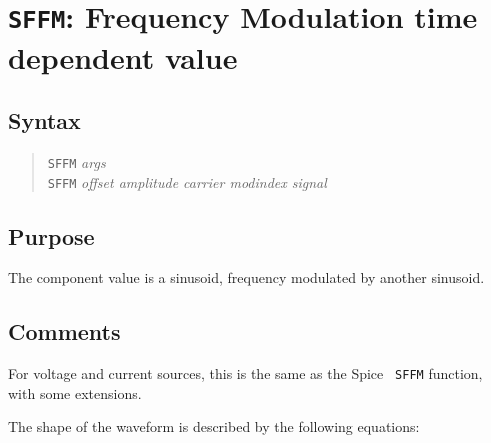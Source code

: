 %
%
%
%
\section{{\tt SFFM}: Frequency Modulation time dependent value}
\subsection{Syntax}
\begin{verse}
{\tt SFFM} {\it args}\\
{\tt SFFM} {\it offset amplitude carrier modindex signal}
\end{verse}
\subsection{Purpose}

The component value is a sinusoid, frequency modulated by another sinusoid.
\subsection{Comments}

For voltage and current sources, this is the same as the Spice {\tt
SFFM} function, with some extensions.

The shape of the waveform is described by the following equations:

